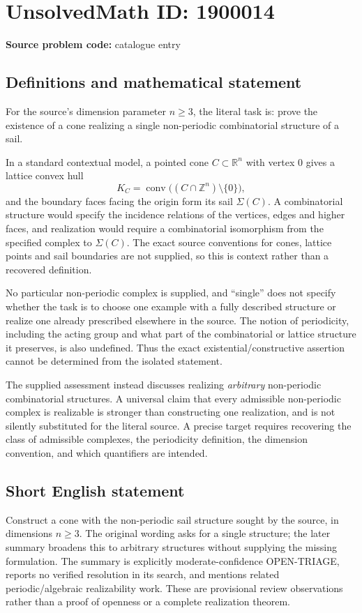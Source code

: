 \documentclass[11pt]{article}
\newcommand{\Z}{\mathbb{Z}}
\newcommand{\R}{\mathbb{R}}
\begin{document}
\section*{UnsolvedMath ID: 1900014}
\textbf{Source problem code:} catalogue entry
\subsection{Definitions and mathematical statement}
For the source's dimension parameter $n\geq3$, the literal task is: prove the existence of a cone realizing a single non-periodic combinatorial structure of a sail.

In a standard contextual model, a pointed cone $C\subset\R^n$ with vertex $0$ gives a lattice convex hull
\[
 K_C=\operatorname{conv}\bigl((C\cap\Z^n)\setminus\{0\}\bigr),
\]
and the boundary faces facing the origin form its sail $\Sigma(C)$. A combinatorial structure would specify the incidence relations of the vertices, edges and higher faces, and realization would require a combinatorial isomorphism from the specified complex to $\Sigma(C)$. The exact source conventions for cones, lattice points and sail boundaries are not supplied, so this is context rather than a recovered definition.

No particular non-periodic complex is supplied, and ``single'' does not specify whether the task is to choose one example with a fully described structure or realize one already prescribed elsewhere in the source. The notion of periodicity, including the acting group and what part of the combinatorial or lattice structure it preserves, is also undefined. Thus the exact existential/constructive assertion cannot be determined from the isolated statement.

The supplied assessment instead discusses realizing \emph{arbitrary} non-periodic combinatorial structures. A universal claim that every admissible non-periodic complex is realizable is stronger than constructing one realization, and is not silently substituted for the literal source. A precise target requires recovering the class of admissible complexes, the periodicity definition, the dimension convention, and which quantifiers are intended.
\subsection{Short English statement}
Construct a cone with the non-periodic sail structure sought by the source, in dimensions $n\geq3$. The original wording asks for a single structure; the later summary broadens this to arbitrary structures without supplying the missing formulation. The summary is explicitly moderate-confidence OPEN-TRIAGE, reports no verified resolution in its search, and mentions related periodic/algebraic realizability work. These are provisional review observations rather than a proof of openness or a complete realization theorem.
\end{document}
